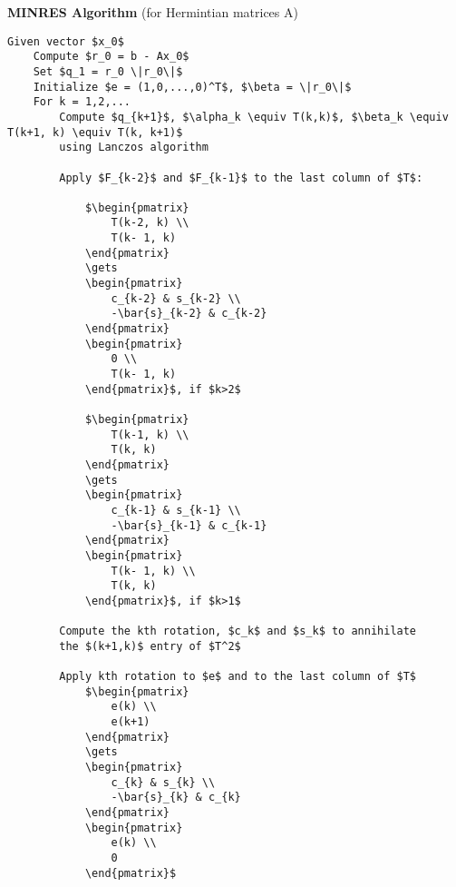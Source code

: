 \textbf{MINRES Algorithm} (for Hermintian matrices A)
\begin{lstlisting}[style=algo]
    Given vector $x_0$ 
    Compute $r_0 = b - Ax_0$
    Set $q_1 = r_0 \|r_0\|$
    Initialize $e = (1,0,...,0)^T$, $\beta = \|r_0\|$
    For k = 1,2,...
        Compute $q_{k+1}$, $\alpha_k \equiv T(k,k)$, $\beta_k \equiv T(k+1, k) \equiv T(k, k+1)$
        using Lanczos algorithm

        Apply $F_{k-2}$ and $F_{k-1}$ to the last column of $T$:

            $\begin{pmatrix}
                T(k-2, k) \\
                T(k- 1, k)
            \end{pmatrix}
            \gets 
            \begin{pmatrix}
                c_{k-2} & s_{k-2} \\
                -\bar{s}_{k-2} & c_{k-2}
            \end{pmatrix}
            \begin{pmatrix}
                0 \\
                T(k- 1, k)
            \end{pmatrix}$, if $k>2$

            $\begin{pmatrix}
                T(k-1, k) \\
                T(k, k)
            \end{pmatrix}
            \gets 
            \begin{pmatrix}
                c_{k-1} & s_{k-1} \\
                -\bar{s}_{k-1} & c_{k-1}
            \end{pmatrix}
            \begin{pmatrix}
                T(k- 1, k) \\
                T(k, k)
            \end{pmatrix}$, if $k>1$

        Compute the kth rotation, $c_k$ and $s_k$ to annihilate 
        the $(k+1,k)$ entry of $T^2$

        Apply kth rotation to $e$ and to the last column of $T$
            $\begin{pmatrix}
                e(k) \\
                e(k+1)
            \end{pmatrix}
            \gets 
            \begin{pmatrix}
                c_{k} & s_{k} \\
                -\bar{s}_{k} & c_{k}
            \end{pmatrix}
            \begin{pmatrix}
                e(k) \\
                0
            \end{pmatrix}$


\end{lstlisting}
